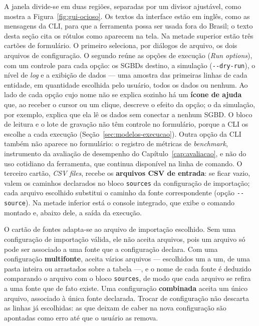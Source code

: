 A janela divide-se em duas regiões, separadas por um divisor ajustável, como mostra a
Figura~\ref{fig:gui-ocioso}. Os textos da interface estão em inglês, como as mensagens da
CLI, para que a ferramenta possa ser usada fora do Brasil; o texto desta seção cita os
rótulos como aparecem na tela. Na metade superior estão três cartões de formulário. O primeiro
seleciona, por diálogos de arquivo, os dois arquivos de configuração. O segundo reúne as
opções de execução (\textit{Run options}), com um controle para cada opção: os SGBDs
destino, a simulação (\texttt{-{}-dry-run}), o nível de \textit{log} e a exibição de dados
--- uma amostra das primeiras linhas de cada entidade, em quantidade escolhida pelo usuário,
todos os dados ou nenhum. Ao lado de cada opção cujo nome não se explica sozinho há um
\textbf{ícone de ajuda} que, ao receber o cursor ou um clique, descreve o efeito da opção; o
da simulação, por exemplo, explica que ela lê os dados sem conectar a nenhum SGBD. O bloco
de leitura e o lote de gravação não têm controle no formulário, porque a CLI os escolhe a
cada execução (Seção~\ref{sec:modelos-execucao}). Outra opção da CLI também
não aparece no formulário: o registro de métricas de \textit{benchmark}, instrumento da
avaliação de desempenho do Capítulo~\ref{cap:avaliacao}, e não do uso cotidiano da
ferramenta, que continua disponível na linha de comando. O terceiro cartão, \textit{CSV
files}, recebe os \textbf{arquivos CSV de entrada}: se ficar vazio, valem os caminhos declarados no bloco
\texttt{sources} da configuração de importação; cada arquivo escolhido substitui o caminho
da fonte correspondente (opção \texttt{-{}-source}). Na metade inferior está o console
integrado, que exibe o comando montado e, abaixo dele, a saída da execução.

O cartão de fontes adapta-se ao arquivo de importação escolhido. Sem uma configuração de
importação válida, ele não aceita arquivos, pois um arquivo só pode ser associado a uma
fonte que a configuração declara. Com uma configuração \textbf{multifonte}, aceita vários
arquivos --- escolhidos um a um, de uma pasta inteira ou arrastados sobre a tabela ---, e o
nome de cada fonte é deduzido comparando o arquivo com o bloco \texttt{sources}, de modo que
cada arquivo se refira a uma fonte que de fato existe. Uma configuração
\textbf{combinada} aceita um único arquivo, associado à única fonte declarada. Trocar de
configuração não descarta as linhas já escolhidas: as que deixam de caber na nova
configuração são apontadas como erro até que o usuário as remova.

